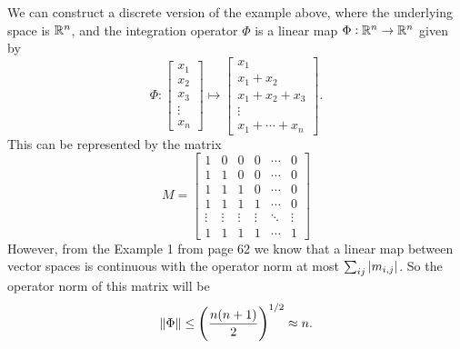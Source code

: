 \begin{observation}
	We can construct a discrete version of the example above, where the underlying space is $ \mathbb{R}^n $, and the integration operator $ \Phi $ is a linear map $ \Phi: \mathbb{R}^n \to \mathbb{R}^n $ given by
	\[ \Phi: \begin{bmatrix}
		x_1 \\ x_2 \\ x_3 \\ \vdots \\ x_n
	\end{bmatrix} \mapsto 
	\begin{bmatrix}
		x_1 \\ x_1+x_2 \\ x_1+x_2+x_3 \\ \vdots \\ x_1+\cdots+x_n
	\end{bmatrix}.
	 \]
	 This can be represented by the matrix
	 \[ M = \begin{bmatrix}
	 	1 & 0 & 0 & 0 & \cdots & 0 \\
	 	1 & 1 & 0 & 0 & \cdots & 0 \\
	 	1 & 1 & 1 & 0 & \cdots & 0 \\
	 	1 & 1 & 1 & 1 & \cdots & 0 \\
	 	\vdots & \vdots & \vdots & \vdots & \ddots & \vdots  \\
	 	1 & 1 & 1 & 1 & \cdots & 1
	 \end{bmatrix} \]
	 However, from the Example 1 from page 62 we know that a linear map between vector spaces is continuous with the operator norm at most $ \sum_{ij} |m_{i,j}| $. So the operator norm of this matrix will be
	 \[ \norm{\Phi} \leq  \left( \frac{n(n+1)}{2} \right)^{1/2} \approx n. \]
\end{observation}

